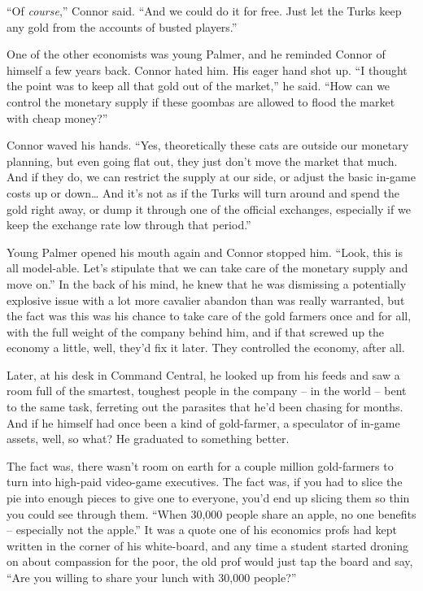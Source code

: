 ``Of \emph{course},'' Connor said. ``And we could do it for free. Just
let the Turks keep any gold from the accounts of busted players.''

One of the other economists was young Palmer, and he reminded
Connor of himself a few years back. Connor hated him. His eager
hand shot up. ``I thought the point was to keep all that gold out of
the market,'' he said. ``How can we control the monetary supply if
these goombas are allowed to flood the market with cheap money?''

Connor waved his hands. ``Yes, theoretically these cats are outside
our monetary planning, but even going flat out, they just don't
move the market that much. And if they do, we can restrict the
supply at our side, or adjust the basic in-game costs up or down\ldots{}
And it's not as if the Turks will turn around and spend the gold
right away, or dump it through one of the official exchanges,
especially if we keep the exchange rate low through that period.''

Young Palmer opened his mouth again and Connor stopped him. ``Look,
this is all model-able. Let's stipulate that we can take care of
the monetary supply and move on.'' In the back of his mind, he knew
that he was dismissing a potentially explosive issue with a lot
more cavalier abandon than was really warranted, but the fact was
this was his chance to take care of the gold farmers once and for
all, with the full weight of the company behind him, and if that
screwed up the economy a little, well, they'd fix it later. They
controlled the economy, after all.

Later, at his desk in Command Central, he looked up from his feeds
and saw a room full of the smartest, toughest people in the company
-- in the world -- bent to the same task, ferreting out the
parasites that he'd been chasing for months. And if he himself had
once been a kind of gold-farmer, a speculator of in-game assets,
well, so what? He graduated to something better.

The fact was, there wasn't room on earth for a couple million
gold-farmers to turn into high-paid video-game executives. The fact
was, if you had to slice the pie into enough pieces to give one to
everyone, you'd end up slicing them so thin you could see through
them. ``When 30,000 people share an apple, no one benefits --
especially not the apple.'' It was a quote one of his economics
profs had kept written in the corner of his white-board, and any
time a student started droning on about compassion for the poor,
the old prof would just tap the board and say, ``Are you willing to
share your lunch with 30,000 people?''

